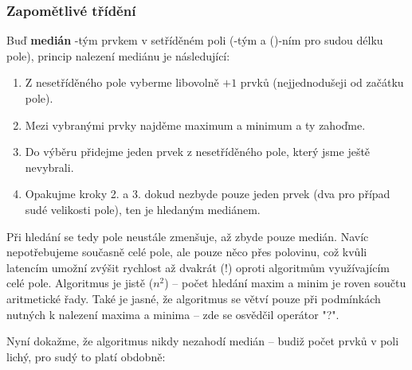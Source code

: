         \subsubsection{Zapomětlivé třídění}

        Buď \textbf{medián} \kk-tým prvkem v setříděném poli (\kk-tým a ()-ním pro sudou délku pole), princip nalezení mediánu je následující:
        \begin{enumerate}
          \item Z nesetříděného pole vyberme libovolně \kk$+1$ prvků (nejjednodušeji od začátku pole).
          \item Mezi vybranými prvky najděme maximum a minimum a ty zahoďme.
          \item Do výběru přidejme jeden prvek z nesetříděného pole, který jsme ještě nevybrali.
          \item Opakujme kroky 2. a 3. dokud nezbyde pouze jeden prvek (dva pro případ sudé velikosti pole), ten je hledaným mediánem.
        \end{enumerate}

        Při hledání se tedy pole neustále zmenšuje, až zbyde pouze medián. Navíc nepotřebujeme současně celé pole, ale pouze něco přes polovinu, což kvůli latencím umožní zvýšit rychlost až dvakrát (!) oproti algoritmům využívajícím celé pole. Algoritmus je jistě \OOO($n^2$) -- počet hledání maxim a minim je roven součtu aritmetické řady. Také je jasné, že algoritmus se větví pouze při podmínkách nutných k nalezení maxima a minima -- zde se osvědčil operátor \Vr"?".

        Nyní dokažme, že algoritmus nikdy nezahodí medián -- budiž počet prvků v poli lichý, pro sudý to platí obdobně:

